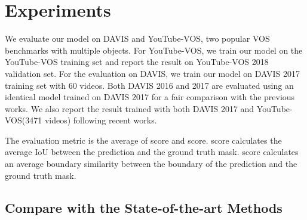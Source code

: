 \documentclass[final]{cvpr}
\begin{document}
\section{Experiments}
We evaluate our model on DAVIS\cite{davis2016,davis2017} and YouTube-VOS\cite{youtubevos}, two popular VOS benchmarks with multiple objects. For YouTube-VOS, we train our model on the YouTube-VOS training set and report the result on YouTube-VOS 2018 validation set. For the evaluation on DAVIS, we train our model on DAVIS 2017 training set with 60 videos. Both DAVIS 2016 and 2017 are evaluated using an identical model trained on DAVIS 2017 for a fair comparison with the previous works. We also report the result trained with both DAVIS 2017 and YouTube-VOS(3471 videos) following recent works. 

The evaluation metric is the average of  score and  score.  score calculates the average IoU between the prediction and the ground truth mask.  score calculates an average boundary similarity between the boundary of the prediction and the ground truth mask. 


\subsection{Compare with the State-of-the-art Methods}
\end{document}
